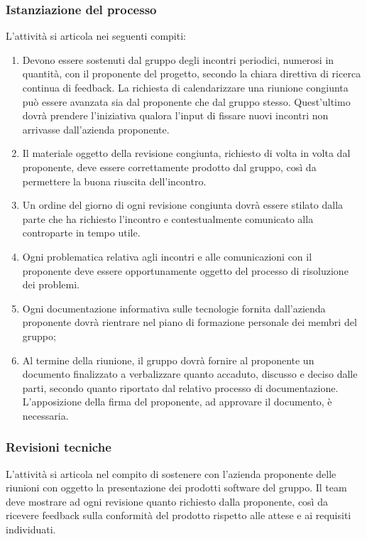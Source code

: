 \subsubsection{Istanziazione del processo}
L'attività si articola nei seguenti compiti:
\begin{enumerate}
    \item Devono essere sostenuti dal gruppo degli incontri periodici, numerosi in quantità, con il proponente del progetto, secondo la chiara direttiva di ricerca continua di feedback. La richiesta di calendarizzare una riunione congiunta può essere avanzata sia dal proponente che dal gruppo stesso. Quest'ultimo  dovrà prendere l'iniziativa qualora l'input di fissare nuovi incontri non arrivasse dall'azienda proponente.
    \item Il materiale oggetto della revisione congiunta, richiesto di volta in volta dal proponente, deve essere correttamente prodotto dal gruppo, così da permettere la buona riuscita dell'incontro.
    \item Un ordine del giorno di ogni revisione congiunta dovrà essere stilato dalla parte che ha richiesto l'incontro e contestualmente comunicato alla controparte in tempo utile.
    \item Ogni problematica relativa agli incontri e alle comunicazioni con il proponente deve essere opportunamente oggetto del processo di risoluzione dei problemi.
    \item Ogni documentazione informativa sulle tecnologie fornita dall'azienda proponente dovrà rientrare nel piano di formazione personale dei membri del gruppo;
    \item Al termine della riunione, il gruppo dovrà fornire al proponente un documento finalizzato a verbalizzare quanto accaduto, discusso e deciso dalle parti, secondo quanto riportato dal relativo processo di documentazione. L'apposizione della firma del proponente, ad approvare il documento, è necessaria.
\end{enumerate}
\subsubsection{Revisioni tecniche}
L'attività si articola nel compito di sostenere con l'azienda proponente delle riunioni con oggetto la presentazione dei prodotti software del gruppo. Il team deve mostrare ad ogni revisione quanto richiesto dalla proponente, così da ricevere feedback sulla conformità del prodotto rispetto alle attese e ai requisiti individuati.
